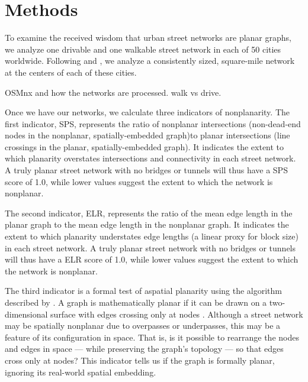\documentclass[Afour,sageh,times]{sagej}
\begin{document}
\section{Methods}

To examine the received wisdom that urban street networks are planar graphs, we analyze one drivable and one walkable street network in each of 50 cities worldwide. Following \citet{jacobs_great_1995} and \citet{cardillo_structural_2006}, we analyze a consistently sized, square-mile network at the centers of each of these cities.

OSMnx and how the networks are processed. walk vs drive.

Once we have our networks, we calculate three indicators of nonplanarity. The first indicator, SPS, represents the ratio of nonplanar intersections (non-dead-end nodes in the nonplanar, spatially-embedded graph)to planar intersections (line crossings in the planar, spatially-embedded graph). It indicates the extent to which planarity overstates intersections and connectivity in each street network. A truly planar street network with no bridges or tunnels will thus have a SPS score of 1.0, while lower values suggest the extent to which the network is nonplanar.

The second indicator, ELR, represents the ratio of the mean edge length in the planar graph to the mean edge length in the nonplanar graph. It indicates the extent to which planarity understates edge lengths (a linear proxy for block size) in each street network. A truly planar street network with no bridges or tunnels will thus have a ELR score of 1.0, while lower values suggest the extent to which the network is nonplanar.

The third indicator is a formal test of aspatial planarity using the algorithm described by \citet{boyer_subgraph_2012}. A graph is mathematically planar if it can be drawn on a two-dimensional surface with edges crossing only at nodes \citep{trudeau_introduction_1994}. Although a street network may be spatially nonplanar due to overpasses or underpasses, this may be a feature of its configuration in space. That is, is it possible to rearrange the nodes and edges in space --- while preserving the graph's topology --- so that edges cross only at nodes? This indicator tells us if the graph is formally planar, ignoring its real-world spatial embedding.
\end{document}

